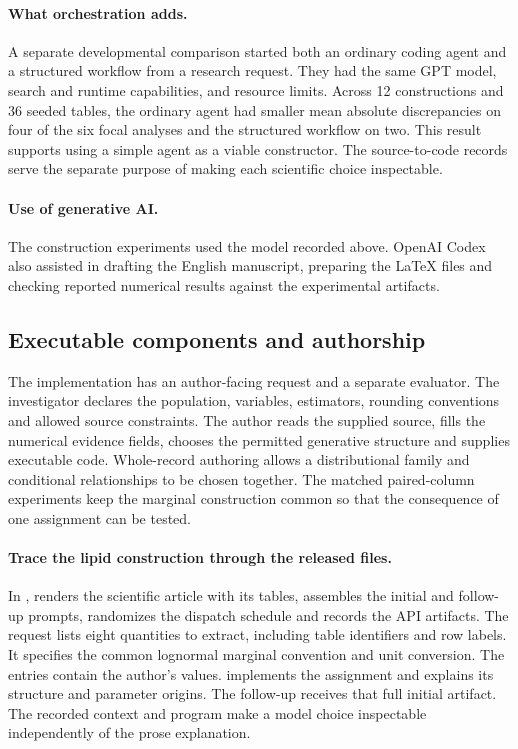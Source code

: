 \paragraph{What orchestration adds.}
A separate developmental comparison started both an ordinary coding agent and a structured workflow from a research request. They had the same GPT model, search and runtime capabilities, and resource limits. Across 12 constructions and 36 seeded tables, the ordinary agent had smaller mean absolute discrepancies on four of the six focal analyses and the structured workflow on two. This result supports using a simple agent as a viable constructor. The source-to-code records serve the separate purpose of making each scientific choice inspectable.

\paragraph{Use of generative AI.}
The construction experiments used the model recorded above. OpenAI Codex also assisted in drafting the English manuscript, preparing the \LaTeX{} files and checking reported numerical results against the experimental artifacts.

\subsection{Executable components and authorship}
\label{app:implementation}
The implementation has an author-facing request and a separate evaluator. The investigator declares the population, variables, estimators, rounding conventions and allowed source constraints. The author reads the supplied source, fills the numerical evidence fields, chooses the permitted generative structure and supplies executable code. Whole-record authoring allows a distributional family and conditional relationships to be chosen together. The matched paired-column experiments keep the marginal construction common so that the consequence of one assignment can be tested.

\paragraph{Trace the lipid construction through the released files.}
In ,  renders the scientific article with its tables, assembles the initial and follow-up prompts, randomizes the dispatch schedule and records the API artifacts. The request lists eight quantities to extract, including table identifiers and row labels. It specifies the common lognormal marginal convention and unit conversion. The  entries contain the author's values.  implements the assignment and  explains its structure and parameter origins. The follow-up receives that full initial artifact. The recorded context and program make a model choice inspectable independently of the prose explanation.

